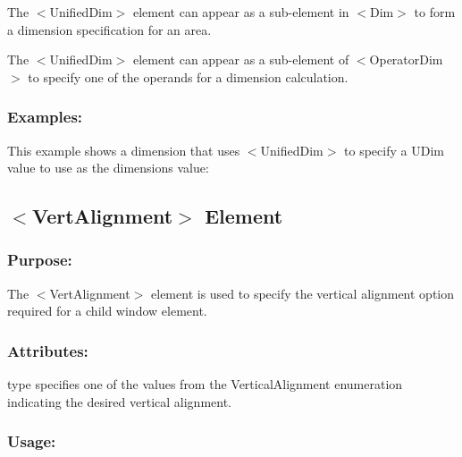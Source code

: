 \begin{DoxyItemize}
\item The {\ttfamily $<$Unified\+Dim$>$} element can appear as a sub-\/element in {\ttfamily $<$Dim$>$} to form a dimension specification for an area. 
\item The {\ttfamily $<$Unified\+Dim$>$} element can appear as a sub-\/element of {\ttfamily $<$Operator\+Dim$>$} to specify one of the operands for a dimension calculation. 
\end{DoxyItemize}\hypertarget{fal_element_ref_fal_elem_ref_sec_34_4}{}\subsubsection{Examples\+:}\label{fal_element_ref_fal_elem_ref_sec_34_4}
This example shows a dimension that uses {\ttfamily $<$Unified\+Dim$>$} to specify a U\+Dim value to use as the dimension\textquotesingle{}s value\+: 
\begin{DoxyCode}{0}
\end{DoxyCode}
\hypertarget{fal_element_ref_fal_elem_ref_sec_35}{}\subsection{$<$\+Vert\+Alignment$>$ Element}\label{fal_element_ref_fal_elem_ref_sec_35}
\hypertarget{fal_element_ref_fal_elem_ref_sec_35_1}{}\subsubsection{Purpose\+:}\label{fal_element_ref_fal_elem_ref_sec_35_1}
The {\ttfamily $<$Vert\+Alignment$>$} element is used to specify the vertical alignment option required for a child window element.\hypertarget{fal_element_ref_fal_elem_ref_sec_35_2}{}\subsubsection{Attributes\+:}\label{fal_element_ref_fal_elem_ref_sec_35_2}
\begin{DoxyItemize}
\item {\ttfamily type} specifies one of the values from the Vertical\+Alignment enumeration indicating the desired vertical alignment.\end{DoxyItemize}
\hypertarget{fal_element_ref_fal_elem_ref_sec_35_3}{}\subsubsection{Usage\+:}\label{fal_element_ref_fal_elem_ref_sec_35_3}

